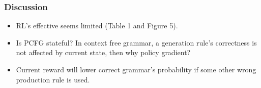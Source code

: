 \begin{frame}
	\frametitle{Discussion}
	\begin{itemize}
		\item RL's effective seems limited (Table 1 and Figure 5).
		\item Is PCFG stateful? In context free grammar, a generation rule's correctness is not affected by current state, then why policy gradient?
		\item Current reward will lower correct grammar's probability if some other wrong production rule is used.
	\end{itemize}
\end{frame}